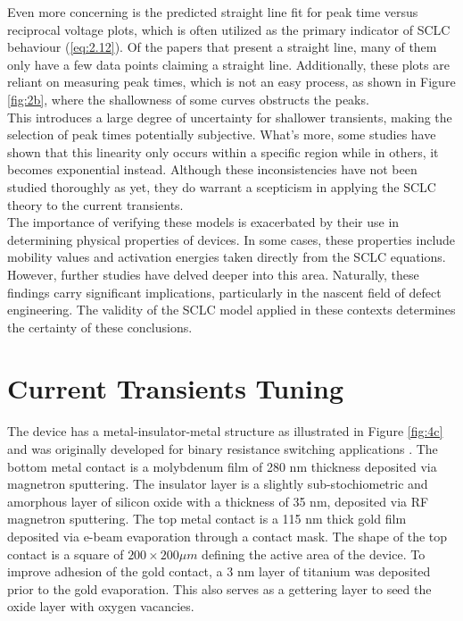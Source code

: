 \noindent Even more concerning is the predicted straight line fit for peak time versus reciprocal voltage plots, which is often utilized as the primary indicator of SCLC behaviour (\ref{eq:2.12}). Of the papers that present a straight line, many of them only have a few data points claiming a straight line. Additionally, these plots are reliant on measuring peak times, which is not an easy process, as shown in Figure \ref{fig:2b}, where the shallowness of some curves obstructs the peaks. \\

\noindent This introduces a large degree of uncertainty for shallower transients, making the selection of peak times potentially subjective. What's more, some studies have shown that this linearity only occurs within a specific region while in others, it becomes exponential instead. Although these inconsistencies have not been studied thoroughly as yet, they do warrant a scepticism in applying the SCLC theory to the current transients.\\

\noindent The importance of verifying these models is exacerbated by their use in determining physical properties of devices. In some cases, these properties include mobility values and activation energies taken directly from the SCLC equations. However, further studies have delved deeper into this area. Naturally, these findings carry significant implications, particularly in the nascent field of defect engineering. The validity of the SCLC model applied in these contexts determines the certainty of these conclusions.

\section[Current Transients Tuning]{Current Transients Tuning}

The device has a metal-insulator-metal structure as illustrated in Figure \ref{fig:4c} and was originally developed for binary resistance switching applications \cite{mehonic2017intrinsic}. The bottom metal contact is a molybdenum film of 280 nm thickness deposited via magnetron sputtering. The insulator layer is a slightly sub-stochiometric and amorphous layer of silicon oxide with a thickness of 35 nm, deposited via RF magnetron sputtering. The top metal contact is a 115 nm thick gold film deposited via e-beam evaporation through a contact mask. The shape of the top contact is a square of $200 \times 200 \mu m$ defining the active area of the device. To improve adhesion of the gold contact, a 3 nm layer of titanium was deposited prior to the gold evaporation. This also serves as a gettering layer to seed the oxide layer with oxygen vacancies.


